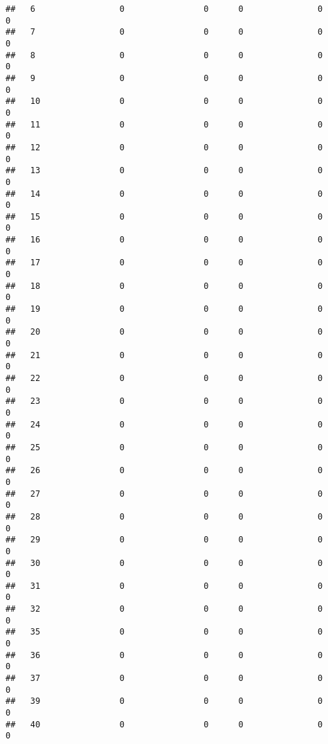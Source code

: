 \documentclass[]{article}
\begin{document}
\begin{verbatim}
##   6                 0                0      0               0                0
##   7                 0                0      0               0                0
##   8                 0                0      0               0                0
##   9                 0                0      0               0                0
##   10                0                0      0               0                0
##   11                0                0      0               0                0
##   12                0                0      0               0                0
##   13                0                0      0               0                0
##   14                0                0      0               0                0
##   15                0                0      0               0                0
##   16                0                0      0               0                0
##   17                0                0      0               0                0
##   18                0                0      0               0                0
##   19                0                0      0               0                0
##   20                0                0      0               0                0
##   21                0                0      0               0                0
##   22                0                0      0               0                0
##   23                0                0      0               0                0
##   24                0                0      0               0                0
##   25                0                0      0               0                0
##   26                0                0      0               0                0
##   27                0                0      0               0                0
##   28                0                0      0               0                0
##   29                0                0      0               0                0
##   30                0                0      0               0                0
##   31                0                0      0               0                0
##   32                0                0      0               0                0
##   35                0                0      0               0                0
##   36                0                0      0               0                0
##   37                0                0      0               0                0
##   39                0                0      0               0                0
##   40                0                0      0               0                0

\end{verbatim}
\end{document}
